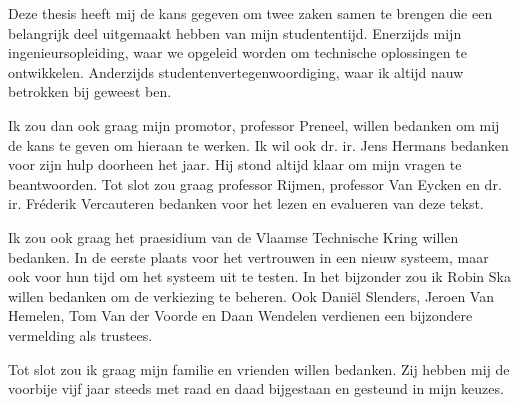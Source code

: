 % 
%

Deze thesis heeft mij de kans gegeven om twee zaken samen te brengen die een belangrijk deel uitgemaakt hebben van mijn studententijd. Enerzijds mijn ingenieursopleiding, waar we opgeleid worden om technische oplossingen te ontwikkelen. Anderzijds studentenvertegenwoordiging, waar ik altijd nauw betrokken bij geweest ben.

\npar Ik zou dan ook graag mijn promotor, professor Preneel, willen bedanken om mij de kans te geven om hieraan te werken. Ik wil ook dr. ir. Jens Hermans bedanken voor zijn hulp doorheen het jaar. Hij stond altijd klaar om mijn vragen te beantwoorden. Tot slot zou graag professor Rijmen, professor Van Eycken en dr. ir. Fréderik Vercauteren bedanken voor het lezen en evalueren van deze tekst.

\npar Ik zou ook graag het praesidium van de Vlaamse Technische Kring willen bedanken. In de eerste plaats voor het vertrouwen in een nieuw systeem, maar ook voor hun tijd om het systeem uit te testen. In het bijzonder zou ik Robin Ska willen bedanken om de verkiezing te beheren. Ook Dani\"el Slenders, Jeroen Van Hemelen, Tom Van der Voorde en Daan Wendelen verdienen een bijzondere vermelding als trustees.

\npar Tot slot zou ik graag mijn familie en vrienden willen bedanken. Zij hebben mij de voorbije vijf jaar steeds met raad en daad bijgestaan en gesteund in mijn keuzes.